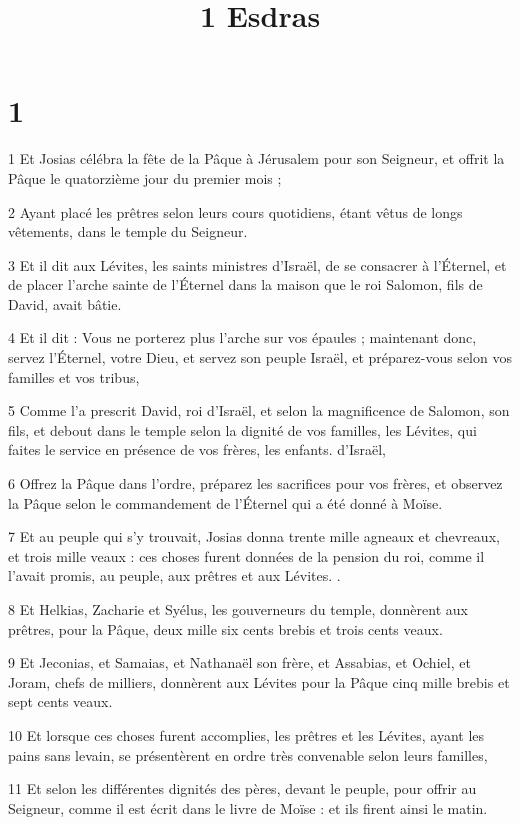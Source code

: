 

\title{1 Esdras}


\chapter{1}

\par 1 Et Josias célébra la fête de la Pâque à Jérusalem pour son Seigneur, et offrit la Pâque le quatorzième jour du premier mois ;
\par 2 Ayant placé les prêtres selon leurs cours quotidiens, étant vêtus de longs vêtements, dans le temple du Seigneur.
\par 3 Et il dit aux Lévites, les saints ministres d'Israël, de se consacrer à l'Éternel, et de placer l'arche sainte de l'Éternel dans la maison que le roi Salomon, fils de David, avait bâtie.
\par 4 Et il dit : Vous ne porterez plus l'arche sur vos épaules ; maintenant donc, servez l'Éternel, votre Dieu, et servez son peuple Israël, et préparez-vous selon vos familles et vos tribus,
\par 5 Comme l'a prescrit David, roi d'Israël, et selon la magnificence de Salomon, son fils, et debout dans le temple selon la dignité de vos familles, les Lévites, qui faites le service en présence de vos frères, les enfants. d'Israël,
\par 6 Offrez la Pâque dans l'ordre, préparez les sacrifices pour vos frères, et observez la Pâque selon le commandement de l'Éternel qui a été donné à Moïse.
\par 7 Et au peuple qui s'y trouvait, Josias donna trente mille agneaux et chevreaux, et trois mille veaux : ces choses furent données de la pension du roi, comme il l'avait promis, au peuple, aux prêtres et aux Lévites. .
\par 8 Et Helkias, Zacharie et Syélus, les gouverneurs du temple, donnèrent aux prêtres, pour la Pâque, deux mille six cents brebis et trois cents veaux.
\par 9 Et Jeconias, et Samaias, et Nathanaël son frère, et Assabias, et Ochiel, et Joram, chefs de milliers, donnèrent aux Lévites pour la Pâque cinq mille brebis et sept cents veaux.
\par 10 Et lorsque ces choses furent accomplies, les prêtres et les Lévites, ayant les pains sans levain, se présentèrent en ordre très convenable selon leurs familles,
\par 11 Et selon les différentes dignités des pères, devant le peuple, pour offrir au Seigneur, comme il est écrit dans le livre de Moïse : et ils firent ainsi le matin.
